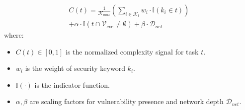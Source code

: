 \begin{equation}
\label{eq:complexity}
\begin{split}
C(t) = \frac{1}{\mathcal{K}_{max}} \left( \sum_{i \in \mathcal{K}_t} w_i \cdot \mathbb{I}(k_i \in t) \right) \\
+ \alpha \cdot \mathbb{I}(t \cap \mathcal{V}_{cve} \neq \emptyset) + \beta \cdot \mathcal{D}_{net}
\end{split}
\end{equation}
where:
\begin{itemize}
    \item $C(t) \in [0, 1]$ is the normalized complexity signal for task $t$.
    \item $w_i$ is the weight of security keyword $k_i$.
    \item $\mathbb{I}(\cdot)$ is the indicator function.
    \item $\alpha, \beta$ are scaling factors for vulnerability presence and network depth $\mathcal{D}_{net}$.
\end{itemize}
